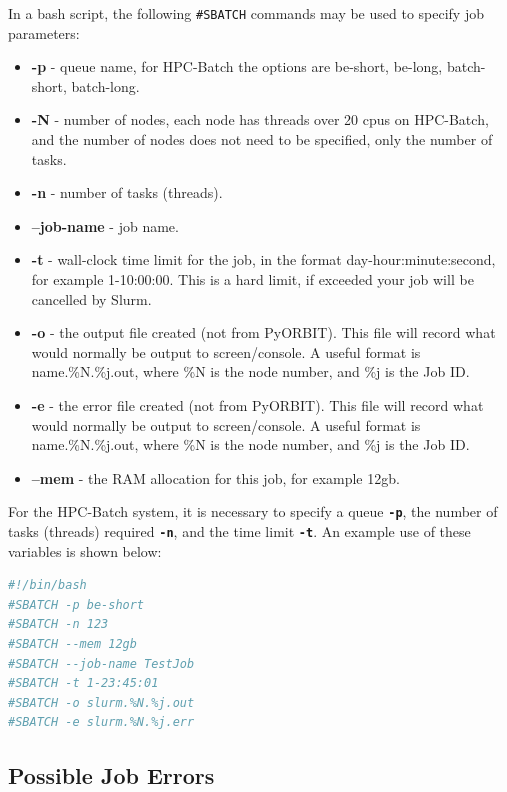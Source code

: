 \documentclass[a4paper]{cernatsnote}
\begin{document}
In a bash script, the following \texttt{\#SBATCH} commands may be used to specify job parameters:

\begin{itemize}
	\item{\textbf{-p}} - queue name, for HPC-Batch the options are be-short, be-long, batch-short, batch-long.
	\item{\textbf{-N}} - number of nodes, each node has threads over 20 cpus on HPC-Batch, and the number of nodes does not need to be specified, only the number of tasks.
	\item{\textbf{-n}} - number of tasks (threads).
	\item{\textbf{--job-name}} - job name.
	\item{\textbf{-t}} - wall-clock time limit for the job, in the format day-hour:minute:second, for example 1-10:00:00. This is a hard limit, if exceeded your job will be cancelled by Slurm.
	\item{\textbf{-o}} - the output file created (not from PyORBIT). This file will record what would normally be output to screen/console. A useful format is name.\%N.\%j.out, where \%N is the node number, and \%j is the Job ID.
	\item{\textbf{-e}} - the error file created (not from PyORBIT). This file will record what would normally be output to screen/console. A useful format is name.\%N.\%j.out, where \%N is the node number, and \%j is the Job ID.
	\item{\textbf{--mem}} - the RAM allocation for this job, for example 12gb.		
\end{itemize}

For the HPC-Batch system, it is necessary to specify a queue \textbf{\texttt{-p}}, the number of tasks (threads) required \textbf{\texttt{-n}}, and the time limit \textbf{\texttt{-t}}. An example use of these variables is shown below:
	
\begin{lstlisting}[language=bash, belowskip=-3\medskipamount]
#!/bin/bash
#SBATCH -p be-short
#SBATCH -n 123
#SBATCH --mem 12gb
#SBATCH --job-name TestJob
#SBATCH -t 1-23:45:01
#SBATCH -o slurm.%N.%j.out
#SBATCH -e slurm.%N.%j.err
\end{lstlisting}


\subsection{Possible Job Errors}
\end{document}
